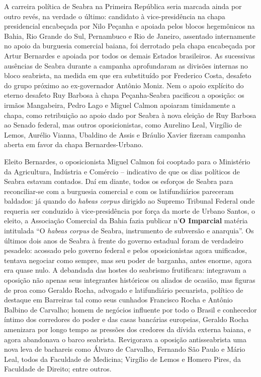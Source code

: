 A carreira política de Seabra na Primeira República seria marcada ainda por outro revés, na verdade o último: candidato à vice-presidência na chapa presidencial encabeçada por Nilo Peçanha e apoiada pelos blocos hegemônicos na Bahia, Rio Grande do Sul, Pernambuco e Rio de Janeiro, assentado internamente no apoio da burguesia comercial baiana, foi derrotado pela chapa encabeçada por Artur Bernardes e apoiada por todos os demais Estados brasileiros. As sucessivas ausências de Seabra durante a campanha aprofundaram as divisões internas no bloco seabrista, na medida em que era substituído por Frederico Costa, desafeto do grupo próximo ao ex-governador Antônio Moniz. Nem o apoio explícito do eterno desafeto Ruy Barbosa à chapa Peçanha-Seabra pacificou a oposição: os irmãos Mangabeira, Pedro Lago e Miguel Calmon apoiaram timidamente a chapa, como retribuição ao apoio dado por Seabra à nova eleição de Ruy Barbosa ao Senado federal, mas outros oposicionistas, como Aurelino Leal, Virgílio de Lemos, Aurélio Vianna, Ubaldino de Assis e Bráulio Xavier fizeram campanha aberta em favor da chapa Bernardes-Urbano. 

Eleito Bernardes, o oposicionista Miguel Calmon foi cooptado para o Ministério da Agricultura, Indústria e Comércio -- indicativo de que os dias políticos de Seabra estavam contados. Daí em diante, todos os esforços de Seabra para reconciliar-se com a burguesia comercial e com os latifundiários pareceram baldados: já quando do \textit{habeas corpus} dirigido ao Supremo Tribunal Federal onde requeria ser conduzido à vice-presidência por força da morte de Urbano Santos, o eleito, a Associação Comercial da Bahia fazia publicar n'\textbf{O Imparcial} matéria intitulada ``O \textit{habeas corpus} de Seabra, instrumento de subversão e anarquia''. Os últimos dois anos de Seabra à frente do governo estadual foram de verdadeiro pesadelo: acossado pelo governo federal e pelos oposicionistas agora unificados, tentava negociar como sempre, mas seu poder de barganha, antes enorme, agora era quase nulo. A debandada das hostes do seabrismo frutificara: integravam a oposição não apenas seus integrantes históricos ou aliados de ocasião, mas figuras de proa como Geraldo Rocha, advogado e latifundiário pecuarista, político de destaque em Barreiras tal como seus cunhados Francisco Rocha e Antônio Balbino de Carvalho; homem de negócios influente por todo o Brasil e conhecedor íntimo dos corredores do poder e das casas bancárias europeias, Geraldo Rocha amenizara por longo tempo as pressões dos credores da dívida externa baiana, e agora abandonava o barco seabrista. Revigorava a oposição antisseabrista uma nova leva de bachareis como Álvaro de Carvalho, Fernando São Paulo e Mário Leal, todos da Faculdade de Medicina; Virgílio de Lemos e Homero Pires, da Faculdade de Direito; entre outros.

